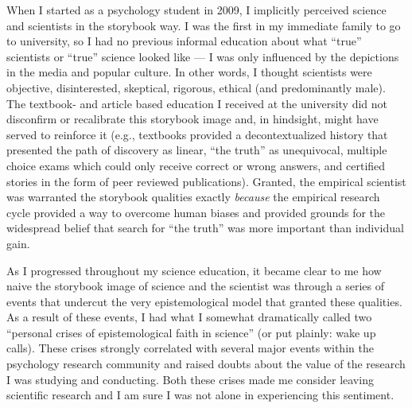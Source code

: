\documentclass[a5paper]{book}
\begin{document}
When I started as a psychology student in 2009, I implicitly perceived
science and scientists in the storybook way. I was the first in my
immediate family to go to university, so I had no previous informal
education about what \enquote{true} scientists or \enquote{true} science
looked like --- I was only influenced by the depictions in the media and
popular culture. In other words, I thought scientists were objective,
disinterested, skeptical, rigorous, ethical (and predominantly male).
The textbook- and article based education I received at the university
did not disconfirm or recalibrate this storybook image and, in
hindsight, might have served to reinforce it (e.g., textbooks provided a
decontextualized history that presented the path of discovery as linear,
\enquote{the truth} as unequivocal, multiple choice exams which could
only receive correct or wrong answers, and certified stories in the form
of peer reviewed publications). Granted, the empirical scientist was
warranted the storybook qualities exactly \emph{because} the empirical
research cycle provided a way to overcome human biases and provided
grounds for the widespread belief that search for \enquote{the truth}
was more important than individual gain.

As I progressed throughout my science education, it became clear to me
how naive the storybook image of science and the scientist was through a
series of events that undercut the very epistemological model that
granted these qualities. As a result of these events, I had what I
somewhat dramatically called two \enquote{personal crises of
epistemological faith in science} (or put plainly: wake up calls). These
crises strongly correlated with several major events within the
psychology research community and raised doubts about the value of the
research I was studying and conducting. Both these crises made me
consider leaving scientific research and I am sure I was not alone in
experiencing this sentiment.
\end{document}
